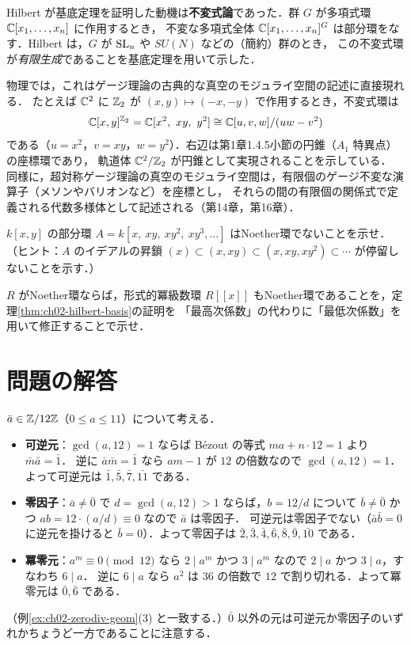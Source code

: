 \begin{physbox}[不変式論とゲージ不変量]
Hilbert が基底定理を証明した動機は\textbf{不変式論}であった．群 $G$ が多項式環 $\mathbb{C}[x_1,\dots,x_n]$ に作用するとき，
不変な多項式全体 $\mathbb{C}[x_1,\dots,x_n]^G$ は部分環をなす．Hilbert は，$G$ が $\operatorname{SL}_n$ や $SU(N)$ などの（簡約）群のとき，
この不変式環が\emph{有限生成}であることを基底定理を用いて示した．

物理では，これはゲージ理論の古典的な真空のモジュライ空間の記述に直接現れる．
たとえば $\mathbb{C}^2$ に $\mathbb{Z}_2$ が $(x,y)\mapsto(-x,-y)$ で作用するとき，不変式環は
\[
  \C[x,y]^{\Z_2}=\C[x^2,\ xy,\ y^2]\cong\C[u,v,w]/(uw-v^2)
\]
である（$u=x^2$，$v=xy$，$w=y^2$）．右辺は第1章1.4.5小節の円錐（$A_1$ 特異点）の座標環であり，
軌道体 $\mathbb{C}^2/\mathbb{Z}_2$ が円錐として実現されることを示している．
同様に，超対称ゲージ理論の真空のモジュライ空間は，有限個のゲージ不変な演算子（メソンやバリオンなど）を座標とし，
それらの間の有限個の関係式で定義される代数多様体として記述される（第14章，第16章）．
\end{physbox}

$k[x,y]$ の部分環 $A=k[x,\ xy,\ xy^2,\ xy^3,\dots]$ はNoether環でないことを示せ．
（ヒント：$A$ のイデアルの昇鎖 $(x)\subset(x,xy)\subset(x,xy,xy^2)\subset\cdots$ が停留しないことを示す．）

$R$ がNoether環ならば，形式的冪級数環 $R[[x]]$ もNoether環であることを，定理\ref{thm:ch02-hilbert-basis}の証明を
「最高次係数」の代わりに「最低次係数」を用いて修正することで示せ．

\section*{問題の解答}

$\bar a\in\mathbb{Z}/12\mathbb{Z}$（$0\le a\le11$）について考える．
\begin{itemize}
  \item \textbf{可逆元}：$\gcd(a,12)=1$ ならば Bézout の等式 $ma+n\cdot12=1$ より $\bar m\bar a=\bar1$．
        逆に $\bar a\bar m=\bar1$ なら $am-1$ が $12$ の倍数なので $\gcd(a,12)=1$．よって可逆元は $\bar1,\bar5,\bar7,\bar{11}$ である．
  \item \textbf{零因子}：$\bar a\ne\bar0$ で $d=\gcd(a,12)>1$ ならば，$b=12/d$ について $\bar b\ne\bar0$ かつ $ab=12\cdot(a/d)\equiv0$ なので $\bar a$ は零因子．
        可逆元は零因子でない（$\bar a\bar b=0$ に逆元を掛けると $\bar b=0$）．よって零因子は $\bar2,\bar3,\bar4,\bar6,\bar8,\bar9,\bar{10}$ である．
  \item \textbf{冪零元}：$a^m\equiv0\pmod{12}$ なら $2\mid a^m$ かつ $3\mid a^m$ なので $2\mid a$ かつ $3\mid a$，すなわち $6\mid a$．
        逆に $6\mid a$ なら $a^2$ は $36$ の倍数で $12$ で割り切れる．よって冪零元は $\bar0,\bar6$ である．
\end{itemize}
（例\ref{ex:ch02-zerodiv-geom}(3) と一致する．）$\bar0$ 以外の元は可逆元か零因子のいずれかちょうど一方であることに注意する．


